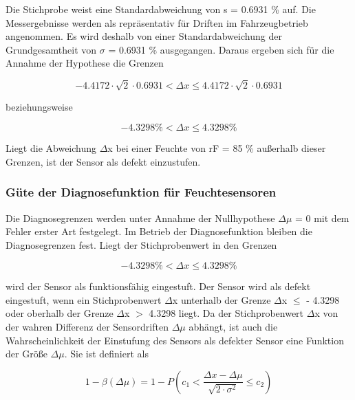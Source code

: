 \noindent Die Stichprobe weist eine Standardabweichung von s = 0.6931 \% auf. Die Messergebnisse werden als repr\"{a}sentativ f\"{u}r Driften im Fahrzeugbetrieb angenommen. Es wird deshalb von einer Standardabweichung der Grundgesamtheit von $\sigma$ = 0.6931 \% ausgegangen. Daraus ergeben sich f\"{u}r die Annahme der Hypothese die Grenzen

\begin{equation}\label{eq:sixonehundredseventytwo}
-4.4172\cdot \sqrt{2} \cdot 0.6931 <\Delta x\le 4.4172\cdot \sqrt{2} \cdot 0.6931
\end{equation}

\noindent beziehungsweise

\begin{equation}\label{eq:sixonehundredseventythree}
- 4.3298 \% <\Delta x\le 4.3298 \%
\end{equation}

\noindent Liegt die Abweichung $\Delta$x bei einer Feuchte von rF = 85 \% au{\ss}erhalb dieser Grenzen, ist der Sensor als defekt einzustufen.

\subsubsection{G\"{u}te der Diagnosefunktion f\"{u}r Feuchtesensoren}

\noindent Die Diagnosegrenzen werden unter Annahme der Nullhypothese $\Delta\mu$ = 0 mit dem Fehler erster Art festgelegt. Im Betrieb der Diagnosefunktion bleiben die Diagnosegrenzen fest. Liegt der Stichprobenwert in den Grenzen

\begin{equation}\label{eq:sixonehundredseventyfour}
-  4.3298 \% <\Delta x\le  4.3298 \%
\end{equation}

\noindent wird der Sensor als funktionsf\"{a}hig eingestuft. Der Sensor wird als defekt eingestuft, wenn ein Stichprobenwert $\Delta$x unterhalb der Grenze $\Delta$x $\leq$ - 4.3298 oder oberhalb der Grenze $\Delta$x $ > $ 4.3298 liegt. Da der Stichprobenwert $\Delta$x von der wahren Differenz der Sensordriften $\Delta\mu$ abh\"{a}ngt, ist auch die Wahrscheinlichkeit der Einstufung des Sensors als defekter Sensor eine Funktion der Gr\"{o}{\ss}e $\Delta\mu$. Sie ist definiert als 

\begin{equation}\label{eq:sixonehundredseventyfive}
1-\beta \left(\Delta \mu \right)=1-P\left(c_{1} <\dfrac{\Delta x-\Delta \mu }{\sqrt{2\cdot \sigma ^{2} } } \le c_{2} \right)
\end{equation}

